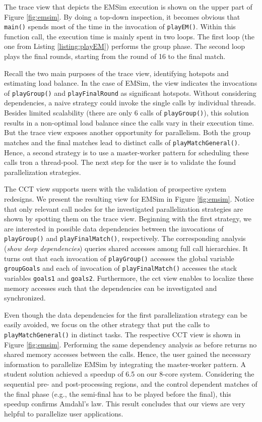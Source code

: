 The trace view that depicts the EMSim execution is shown on the upper part
of Figure \ref{fig:emsim}. By doing a top-down inspection, it becomes obvious
that \texttt{main()} spends most of the time in the invocation of
\texttt{playEM()}. Within this function call, the execution time is mainly
spent in two loops. The first loop (the one from Listing \ref{listing:playEM})
performs the group phase. The second loop plays the final rounds, starting from
the round of 16 to the final match.

Recall the two main purposes of the trace view, identifying hotspots
and estimating load balance. In the case of EMSim, the view indicates the
invocations of \texttt{playGroup()} and \texttt{playFinalRound} as significant
hotspots. Without considering dependencies, a naive strategy could invoke the
single calls by individual threads. Besides limited scalability (there are only
6 calls of \texttt{playGroup()}), this solution results in a non-optimal load
balance since the calls vary in their execution time. But the trace view
exposes another opportunity for parallelism. Both the group matches and the
final matches lead to distinct calls of \texttt{playMatchGeneral()}. Hence,
a second strategy is to use a master-worker pattern for scheduling these calls
tron a thread-pool. The next step for the user is to validate the found
parallelization strategies.

The CCT view supports users with the validation of prospective system
redesigns. We present the resulting view for EMSim in Figure \ref{fig:emsim}.
Notice that only relevant call nodes for the investigated parallelization
strategies are shown by spotting them on the trace view. Beginning with the
first strategy, we are interested in possible data dependencies between the
invocations of \texttt{playGroup()} and \texttt{playFinalMatch()},
respectively. The corresponding analysis (\textit{show deep dependencies})
queries shared accesses among full call hierarchies. It turns out that each
invocation of \texttt{playGroup()} accesses the global variable
\texttt{groupGoals} and each of invocation of \texttt{playFinalMatch()}
accesses the stack variables \texttt{goals1} and \texttt{goals2}.
Furthermore, the cct view enables to localize these memory accesses such that
the dependencies can be investigated and synchronized.


Even though the data dependencies for the first parallelization strategy
can be easily avoided, we focus on the other strategy that put the calls to
\texttt{playMatchGeneral()} in distinct tasks. The respective CCT view is shown
in Figure \ref{fig:emsim}. Performing the same dependency analysis as
before returns no shared memory accesses between the calls. Hence, the user
gained the necessary information to parallelize EMSim by integrating the
master-worker pattern. A student solution achieved a speedup of 6.5 on our
8-core system. Considering the sequential pre- and post-processing regions,
and the control dependent matches of the final phase (e.g., the semi-final has 
to be played before the final), this speedup confirms Amdahl's law. This result
concludes that our views are very helpful to parallelize user applications.
